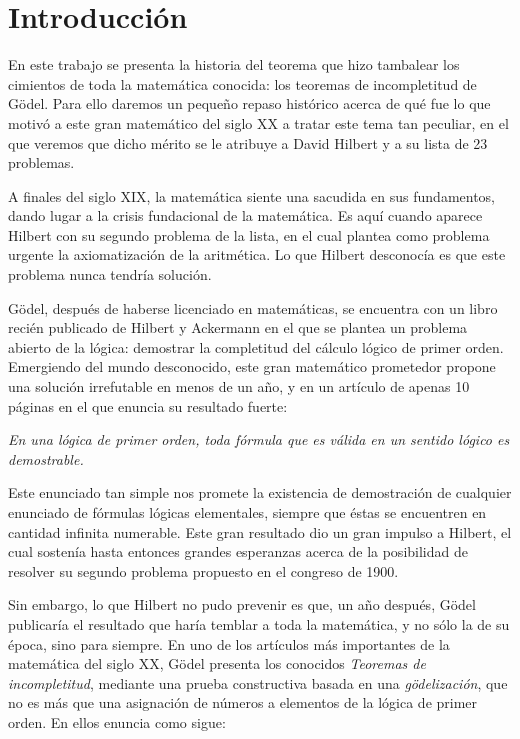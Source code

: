 %


\chapter{Introducción}

En este trabajo se presenta la historia del teorema que hizo tambalear los cimientos de toda la matemática conocida:
los teoremas de incompletitud de Gödel. Para ello daremos un pequeño repaso histórico acerca de qué fue lo 
que motivó a este gran matemático del siglo XX a tratar este tema tan peculiar, en el que veremos que dicho 
mérito se le atribuye a David Hilbert y a su lista de 23 problemas.

A finales del siglo XIX, la matemática  siente una sacudida en sus fundamentos, dando lugar a la crisis fundacional
de la matemática. Es aquí cuando aparece Hilbert con su segundo problema de la lista, en el cual plantea como 
problema urgente la axiomatización de la aritmética. Lo que Hilbert desconocía es que este problema nunca tendría solución.

Gödel, después de haberse licenciado en matemáticas, se encuentra con un libro recién publicado de Hilbert y Ackermann en el que se plantea
un problema abierto de la lógica: demostrar la completitud del cálculo lógico 
de primer orden. Emergiendo del mundo desconocido, este gran matemático prometedor propone una solución irrefutable en menos de un año, 
y en un artículo de apenas 10 páginas en el que enuncia su resultado fuerte:

\begin{center}
    \textit{En una lógica de primer orden, toda fórmula que es válida en un sentido lógico es demostrable.}
\end{center}

Este enunciado tan simple nos promete la existencia de demostración de cualquier enunciado de fórmulas lógicas elementales, siempre
que éstas se encuentren en cantidad infinita numerable. Este gran resultado dio un gran impulso a Hilbert, el cual sostenía 
hasta entonces grandes esperanzas acerca de la posibilidad de resolver su segundo problema propuesto en el congreso de 1900.

Sin embargo, lo que Hilbert no pudo prevenir es que, un año después, Gödel publicaría el resultado que haría temblar a toda la matemática, 
y no sólo la de su época, sino para siempre. En uno de los artículos más importantes de la matemática del siglo XX, Gödel presenta los 
conocidos \textit{Teoremas de incompletitud}, mediante una prueba constructiva basada en una \textit{gödelización}, que no es más que una asignación
de números a elementos de la lógica de primer orden. En ellos enuncia como sigue:

